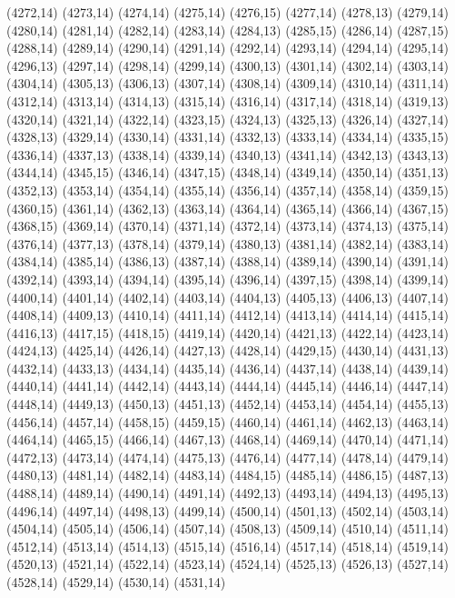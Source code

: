 (4272,14)
(4273,14)
(4274,14)
(4275,14)
(4276,15)
(4277,14)
(4278,13)
(4279,14)
(4280,14)
(4281,14)
(4282,14)
(4283,14)
(4284,13)
(4285,15)
(4286,14)
(4287,15)
(4288,14)
(4289,14)
(4290,14)
(4291,14)
(4292,14)
(4293,14)
(4294,14)
(4295,14)
(4296,13)
(4297,14)
(4298,14)
(4299,14)
(4300,13)
(4301,14)
(4302,14)
(4303,14)
(4304,14)
(4305,13)
(4306,13)
(4307,14)
(4308,14)
(4309,14)
(4310,14)
(4311,14)
(4312,14)
(4313,14)
(4314,13)
(4315,14)
(4316,14)
(4317,14)
(4318,14)
(4319,13)
(4320,14)
(4321,14)
(4322,14)
(4323,15)
(4324,13)
(4325,13)
(4326,14)
(4327,14)
(4328,13)
(4329,14)
(4330,14)
(4331,14)
(4332,13)
(4333,14)
(4334,14)
(4335,15)
(4336,14)
(4337,13)
(4338,14)
(4339,14)
(4340,13)
(4341,14)
(4342,13)
(4343,13)
(4344,14)
(4345,15)
(4346,14)
(4347,15)
(4348,14)
(4349,14)
(4350,14)
(4351,13)
(4352,13)
(4353,14)
(4354,14)
(4355,14)
(4356,14)
(4357,14)
(4358,14)
(4359,15)
(4360,15)
(4361,14)
(4362,13)
(4363,14)
(4364,14)
(4365,14)
(4366,14)
(4367,15)
(4368,15)
(4369,14)
(4370,14)
(4371,14)
(4372,14)
(4373,14)
(4374,13)
(4375,14)
(4376,14)
(4377,13)
(4378,14)
(4379,14)
(4380,13)
(4381,14)
(4382,14)
(4383,14)
(4384,14)
(4385,14)
(4386,13)
(4387,14)
(4388,14)
(4389,14)
(4390,14)
(4391,14)
(4392,14)
(4393,14)
(4394,14)
(4395,14)
(4396,14)
(4397,15)
(4398,14)
(4399,14)
(4400,14)
(4401,14)
(4402,14)
(4403,14)
(4404,13)
(4405,13)
(4406,13)
(4407,14)
(4408,14)
(4409,13)
(4410,14)
(4411,14)
(4412,14)
(4413,14)
(4414,14)
(4415,14)
(4416,13)
(4417,15)
(4418,15)
(4419,14)
(4420,14)
(4421,13)
(4422,14)
(4423,14)
(4424,13)
(4425,14)
(4426,14)
(4427,13)
(4428,14)
(4429,15)
(4430,14)
(4431,13)
(4432,14)
(4433,13)
(4434,14)
(4435,14)
(4436,14)
(4437,14)
(4438,14)
(4439,14)
(4440,14)
(4441,14)
(4442,14)
(4443,14)
(4444,14)
(4445,14)
(4446,14)
(4447,14)
(4448,14)
(4449,13)
(4450,13)
(4451,13)
(4452,14)
(4453,14)
(4454,14)
(4455,13)
(4456,14)
(4457,14)
(4458,15)
(4459,15)
(4460,14)
(4461,14)
(4462,13)
(4463,14)
(4464,14)
(4465,15)
(4466,14)
(4467,13)
(4468,14)
(4469,14)
(4470,14)
(4471,14)
(4472,13)
(4473,14)
(4474,14)
(4475,13)
(4476,14)
(4477,14)
(4478,14)
(4479,14)
(4480,13)
(4481,14)
(4482,14)
(4483,14)
(4484,15)
(4485,14)
(4486,15)
(4487,13)
(4488,14)
(4489,14)
(4490,14)
(4491,14)
(4492,13)
(4493,14)
(4494,13)
(4495,13)
(4496,14)
(4497,14)
(4498,13)
(4499,14)
(4500,14)
(4501,13)
(4502,14)
(4503,14)
(4504,14)
(4505,14)
(4506,14)
(4507,14)
(4508,13)
(4509,14)
(4510,14)
(4511,14)
(4512,14)
(4513,14)
(4514,13)
(4515,14)
(4516,14)
(4517,14)
(4518,14)
(4519,14)
(4520,13)
(4521,14)
(4522,14)
(4523,14)
(4524,14)
(4525,13)
(4526,13)
(4527,14)
(4528,14)
(4529,14)
(4530,14)
(4531,14)
